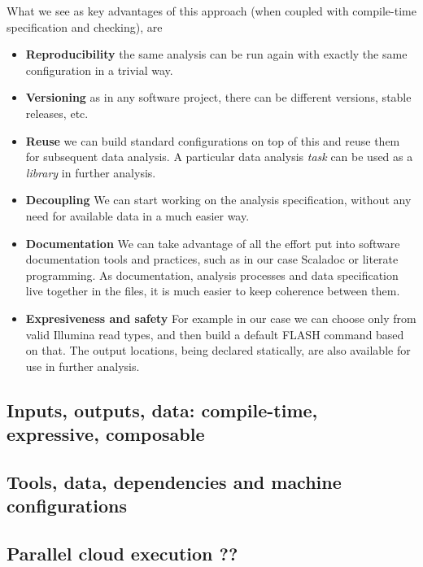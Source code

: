 \documentclass{frontiersSCNS} %
\providecommand{\tightlist}{%
\setlength{\itemsep}{0pt}\setlength{\parskip}{0pt}}
\begin{document}
What we see as key advantages of this approach (when coupled with
compile-time specification and checking), are

\begin{itemize}
\tightlist
\item
  \textbf{Reproducibility} the same analysis can be run again with
  exactly the same configuration in a trivial way.
\item
  \textbf{Versioning} as in any software project, there can be different
  versions, stable releases, etc.
\item
  \textbf{Reuse} we can build standard configurations on top of this and
  reuse them for subsequent data analysis. A particular data analysis
  \emph{task} can be used as a \emph{library} in further analysis.
\item
  \textbf{Decoupling} We can start working on the analysis
  specification, without any need for available data in a much easier
  way.
\item
  \textbf{Documentation} We can take advantage of all the effort put
  into software documentation tools and practices, such as in our case
  Scaladoc or literate programming. As documentation, analysis processes
  and data specification live together in the files, it is much easier
  to keep coherence between them.
\item
  \textbf{Expresiveness and safety} For example in our case we can
  choose only from valid Illumina read types, and then build a default
  FLASH command based on that. The output locations, being declared
  statically, are also available for use in further analysis.
\end{itemize}

\subsection{Inputs, outputs, data: compile-time, expressive,
composable}\label{inputs-outputs-data-compile-time-expressive-composable}

\subsection{Tools, data, dependencies and machine
configurations}\label{tools-data-dependencies-and-machine-configurations}

\subsection{Parallel cloud execution ??}\label{parallel-cloud-execution}
\end{document}
